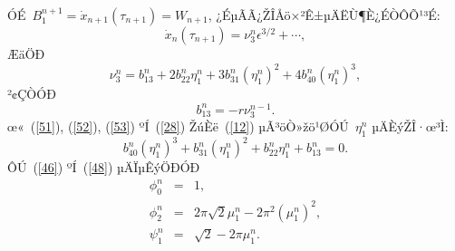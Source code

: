 \documentclass[12pt,openany,CJK,oneside]{cctbook}
\begin{document}
{ÓÉ\ $B_{1}^{n+1}=\dot{x}_{n+1}(\tau_{n+1})=W_{n+1}$, ¿ÉµÃÃ¿ŽÎÅö×²Ê±µÄËÙ¶È¿ÉÒÔÕ¹³É:
\begin{equation}\label{60}
  \dot{x}_{n}(\tau_{n+1})=\nu_{3}^{n}\epsilon^{3/2}+\cdots,
\end{equation}
ÆäÖÐ
\begin{equation}\label{61}
  \nu_{3}^{n}=b_{13}^{n}+2b_{22}^{n}\eta_{1}^{n}+3b_{31}^{n}(\eta_{1}^{n})^{2}+4b_{40}^{n}(\eta_{1}^{n})^{3},
\end{equation}
²¢ÇÒÓÐ
\begin{equation}\label{62}
  b_{13}^{n}=-r\nu_{3}^{n-1}.
\end{equation}
œ«\ (\ref{51}), (\ref{52}), (\ref{53}) ºÍ\ (\ref{28}) ŽúÈë\ (\ref{12}) µÃ³öÒ»žö¹ØÓÚ\ $\eta_{1}^{n}$ µÄÈýŽÎ·œ³Ì:
\begin{equation}\label{63}
   b_{40}^{n}(\eta_{1}^{n})^{3}+b_{31}^{n}(\eta_{1}^{n})^{2}+b_{22}^{n}\eta_{1}^{n}+b_{13}^{n}=0.
\end{equation}
ÔÚ\ (\ref{46}) ºÍ\ (\ref{48}) µÄÏµÊýÖÐÓÐ
\begin{eqnarray*}
  \phi_{0}^{n} &=& 1 ,\\
  \phi_{2}^{n} &=& 2\pi\sqrt{2}\mu_{1}^{n}-2\pi^{2}(\mu_{1}^{n})^{2} ,\\
  \psi_{1}^{n} &=& \sqrt{2}-2\pi\mu_{1}^{n} .
\end{eqnarray*}

}
\end{document}
